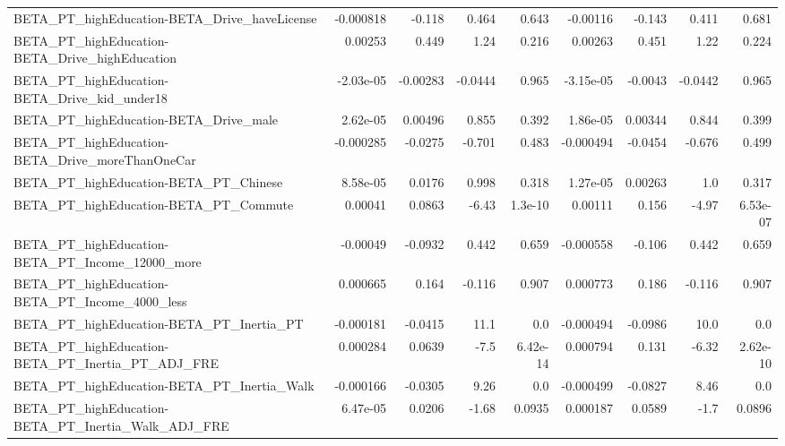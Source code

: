 \begin{tabular}{lrrrrrrrr}
BETA\_PT\_highEducation-BETA\_Drive\_haveLicense       &   -0.000818 &       -0.118 &    0.464 &    0.643 &   -0.00116 &      -0.143 &        0.411 &         0.681 \\
BETA\_PT\_highEducation-BETA\_Drive\_highEducation     &     0.00253 &        0.449 &     1.24 &    0.216 &    0.00263 &       0.451 &         1.22 &         0.224 \\
BETA\_PT\_highEducation-BETA\_Drive\_kid\_under18       &   -2.03e-05 &     -0.00283 &  -0.0444 &    0.965 &  -3.15e-05 &     -0.0043 &      -0.0442 &         0.965 \\
BETA\_PT\_highEducation-BETA\_Drive\_male              &    2.62e-05 &      0.00496 &    0.855 &    0.392 &   1.86e-05 &     0.00344 &        0.844 &         0.399 \\
BETA\_PT\_highEducation-BETA\_Drive\_moreThanOneCar    &   -0.000285 &      -0.0275 &   -0.701 &    0.483 &  -0.000494 &     -0.0454 &       -0.676 &         0.499 \\
BETA\_PT\_highEducation-BETA\_PT\_Chinese              &    8.58e-05 &       0.0176 &    0.998 &    0.318 &   1.27e-05 &     0.00263 &          1.0 &         0.317 \\
BETA\_PT\_highEducation-BETA\_PT\_Commute              &     0.00041 &       0.0863 &    -6.43 &  1.3e-10 &    0.00111 &       0.156 &        -4.97 &      6.53e-07 \\
BETA\_PT\_highEducation-BETA\_PT\_Income\_12000\_more    &    -0.00049 &      -0.0932 &    0.442 &    0.659 &  -0.000558 &      -0.106 &        0.442 &         0.659 \\
BETA\_PT\_highEducation-BETA\_PT\_Income\_4000\_less     &    0.000665 &        0.164 &   -0.116 &    0.907 &   0.000773 &       0.186 &       -0.116 &         0.907 \\
BETA\_PT\_highEducation-BETA\_PT\_Inertia\_PT           &   -0.000181 &      -0.0415 &     11.1 &      0.0 &  -0.000494 &     -0.0986 &         10.0 &           0.0 \\
BETA\_PT\_highEducation-BETA\_PT\_Inertia\_PT\_ADJ\_FRE   &    0.000284 &       0.0639 &     -7.5 & 6.42e-14 &   0.000794 &       0.131 &        -6.32 &      2.62e-10 \\
BETA\_PT\_highEducation-BETA\_PT\_Inertia\_Walk         &   -0.000166 &      -0.0305 &     9.26 &      0.0 &  -0.000499 &     -0.0827 &         8.46 &           0.0 \\
BETA\_PT\_highEducation-BETA\_PT\_Inertia\_Walk\_ADJ\_FRE &    6.47e-05 &       0.0206 &    -1.68 &   0.0935 &   0.000187 &      0.0589 &         -1.7 &        0.0896 \\

\end{tabular}
